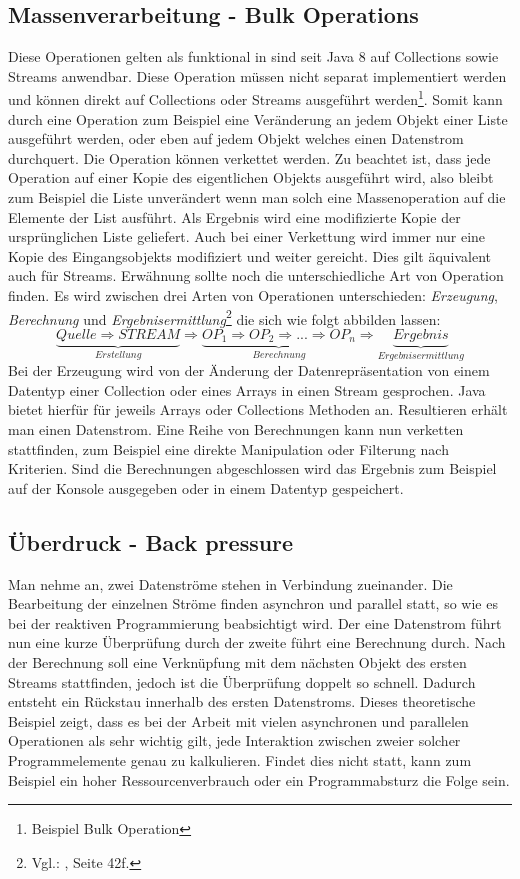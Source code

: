 \subsection{Massenverarbeitung - Bulk Operations}
Diese Operationen gelten als funktional in sind seit Java 8 auf Collections sowie Streams anwendbar. Diese Operation müssen nicht separat implementiert werden und können direkt auf Collections oder Streams ausgeführt werden\footnote{Beispiel Bulk Operation}. Somit kann durch eine Operation zum Beispiel eine Veränderung an jedem Objekt einer Liste ausgeführt werden, oder eben auf jedem Objekt welches einen Datenstrom durchquert. Die Operation können verkettet werden. Zu beachtet ist, dass jede Operation auf einer Kopie des eigentlichen Objekts ausgeführt wird, also bleibt zum Beispiel die Liste unverändert wenn man solch eine Massenoperation auf die Elemente der List ausführt. Als Ergebnis wird eine modifizierte Kopie der ursprünglichen Liste geliefert. Auch bei einer Verkettung wird immer nur eine Kopie des Eingangsobjekts modifiziert und weiter gereicht. Dies gilt äquivalent auch für Streams. Erwähnung sollte noch die unterschiedliche Art von Operation finden. Es wird zwischen drei Arten von Operationen unterschieden: \textit{Erzeugung}, \textit{Berechnung} und \textit{Ergebnisermittlung}\footnote{Vgl.: \cite{Inden.2015}, Seite 42f.} die sich wie folgt abbilden lassen: 
\begin{displaymath}
	\underbrace{Quelle \Rightarrow STREAM}_{Erstellung} \Rightarrow \underbrace{OP_{1} \Rightarrow OP_{2} \Rightarrow ... \Rightarrow OP_{n}}_{Berechnung} \Rightarrow \underbrace{Ergebnis}_{Ergebnisermittlung}
\end{displaymath}
Bei der Erzeugung wird von der Änderung der Datenrepräsentation von einem Datentyp einer Collection oder eines Arrays in einen Stream gesprochen. Java bietet hierfür für jeweils Arrays oder Collections Methoden an. Resultieren erhält man einen Datenstrom. Eine Reihe von Berechnungen kann nun verketten stattfinden, zum Beispiel eine direkte Manipulation oder Filterung nach Kriterien. Sind die Berechnungen abgeschlossen wird das Ergebnis zum Beispiel auf der Konsole ausgegeben oder in einem Datentyp gespeichert.
\subsection{Überdruck - Back pressure}
Man nehme an, zwei Datenströme stehen in Verbindung zueinander. Die Bearbeitung der einzelnen Ströme finden asynchron und parallel statt, so wie es bei der reaktiven Programmierung beabsichtigt wird. Der eine Datenstrom führt nun eine kurze Überprüfung durch der zweite führt eine Berechnung durch. Nach der Berechnung soll eine Verknüpfung mit dem nächsten Objekt des ersten Streams stattfinden, jedoch ist die Überprüfung doppelt so schnell. Dadurch entsteht ein Rückstau innerhalb des ersten Datenstroms. Dieses theoretische Beispiel zeigt, dass es bei der Arbeit mit vielen asynchronen und parallelen Operationen als sehr wichtig gilt, jede Interaktion zwischen zweier solcher Programmelemente genau zu kalkulieren. Findet dies nicht statt, kann zum Beispiel ein hoher Ressourcenverbrauch oder ein Programmabsturz die Folge sein.
